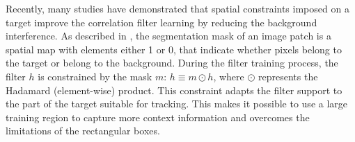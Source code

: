 \documentclass[review]{elsarticle}
\begin{document}
\begin{CJK*}{UTF8}{gbsn}
Recently, many studies \cite{Danelljan2015LearningSR, Lukezic2017DiscriminativeCF, Galoogahi2017LearningBC, Xu2018LearningAD, Feng2018LearningSR} have demonstrated that spatial constraints imposed on a target improve the correlation filter learning by reducing the background interference. As described in \cite{Lukezic2017DiscriminativeCF}, the segmentation mask of an image patch is a spatial map with elements either 1 or 0, that indicate whether pixels belong to the target or belong to the background. During the filter training process, the filter $h$ is constrained by the mask $m$: $h \equiv m \odot h$, where $\odot$ represents the Hadamard (element-wise) product. This constraint adapts the filter support to the part of the target suitable for tracking. This makes it possible to use a large training region to capture more context information and overcomes the limitations of the rectangular boxes.


\end{CJK*}
\end{document}
